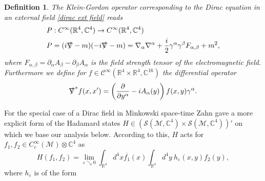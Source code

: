 \documentclass[b5paper,draft,openbib,12pt]{memoir}
\newtheorem{Def}{Definition}
\begin{document}
\begin{Def}
The Klein-Gordon operator corresponding to the Dirac 
equation in an external field \eqref{dirac ext field} reads
\begin{align}
&P: C^\infty(\mathbb{R}^4,\mathbb{C}^4)\rightarrow C^\infty(\mathbb{R}^4,\mathbb{C}^4)\\
&P=(i\slashed{\nabla}-m)(-i\slashed{\nabla}-m)=\nabla_\alpha \nabla^\alpha + \frac{i}{2} \gamma^\alpha \gamma^\beta F_{\alpha,\beta} +m^2,
\end{align}
where \(F_{\alpha,\beta}=\partial_\alpha A_\beta - \partial_\beta A_\alpha\) is the field strength tensor of the electromagnetic field. Furthermore we 
define for \(f\in \mathcal{C}^\infty(\mathbb{R}^4\times \mathbb{R}^4,\mathbb{C}^{16})\) the differential operator
\begin{equation}
\slashed{\nabla}^* f(x,x')=\left(\frac{\partial}{\partial y^\alpha} - i A_\alpha(y)\right)f(x,y)\gamma^\alpha.
\end{equation}
\end{Def}


For the special case of a Dirac field in Minkowski space-time Zahn \cite{schlemmer2015current} gave a more explicit form of
the Hadamard states \(H \in (\mathcal{S}(\mathcal{M},\mathbb{C}^4)\times \mathcal{S}(\mathcal{M},\mathbb{C}^4))'\)  on which we base our analysis below.
According to this, \(H\) 
acts for \(f_1,f_2\in C_c^\infty(\mathcal{M})\otimes \mathbb{C}^4\) as 
\begin{equation}\label{eq:hadamard1}
H(f_1,f_2)=\lim_{\varepsilon\searrow 0} \int_{\mathbb{R}^4}d^4 x \overline{f_1}(x) \int_{\mathbb{R}^4} d^4y ~h_\varepsilon(x,y) f_2(y),
\end{equation}
where \(h_\varepsilon\) is of the form
\end{document}
